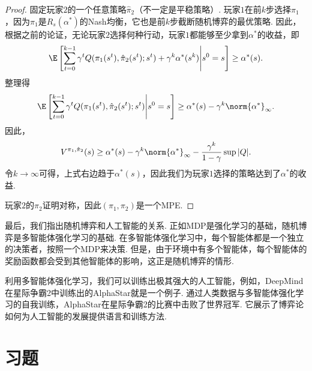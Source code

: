 \begin{proof}
固定玩家$2$的一个任意策略$\hat{\pi}_2$（不一定是平稳策略）. 玩家$1$在前$k$步选择$\pi_1$，因为$\pi_1$是$R_s(\alpha^*)$的Nash均衡，它也是前$k$步截断随机博弈的最优策略. 因此，根据之前的论证，无论玩家$2$选择何种行动，玩家$1$都能够至少拿到$\alpha^*$的收益，即
\[\E\left[\sum_{t=0}^{k-1}\gamma^tQ(\pi_1(s^t),\hat{\pi}_2(s^t);s^t)+\gamma^k\alpha^*(s^k)\middle|s^0=s\right]\ge \alpha^*(s).\]
整理得
\[\E\left[\sum_{t=0}^{k-1}\gamma^tQ(\pi_1(s^t),\hat{\pi}_2(s^t);s^t)\middle|s^0=s\right]\ge \alpha^*(s)-\gamma^k\norm{\alpha^*}_\infty.\]
因此，
\[V^{\pi_1,\hat{\pi}_2}(s)\ge \alpha^*(s) - \gamma^k\norm{\alpha^*}_\infty - \frac{\gamma^k}{1-\gamma}\sup|Q|.\]
令$k\to\infty$可得，上式右边趋于$\alpha^*(s)$，因此我们为玩家$1$选择的策略达到了$\alpha^*$的收益. 

玩家$2$的$\pi_2$证明对称，因此$(\pi_1,\pi_2)$是一个MPE.
\end{proof}

最后，我们指出随机博弈和人工智能的关系. 正如MDP是强化学习的基础，随机博弈是多智能体强化学习的基础. 在多智能体强化学习中，每个智能体都是一个独立的决策者，按照一个MDP来决策. 但是，由于环境中有多个智能体，每个智能体的奖励函数都会受到其他智能体的影响，这正是随机博弈的情形. 

利用多智能体强化学习，我们可以训练出极其强大的人工智能，例如，DeepMind在星际争霸2中训练出的AlphaStar就是一个例子. 通过人类数据与多智能体强化学习的自我训练，AlphaStar在星际争霸2的比赛中击败了世界冠军. 它展示了博弈论如何为人工智能的发展提供语言和训练方法. 

\section{习题}




